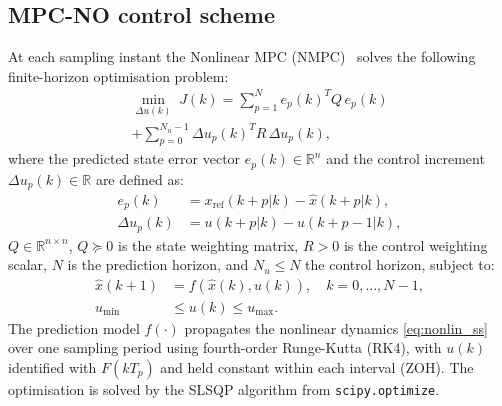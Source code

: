 \documentclass[twocolumn]{svjour3}
\begin{document}
\subsection{MPC-NO control scheme}

At each sampling instant the Nonlinear MPC (NMPC)~\cite{Camacho2026} solves the following
finite-horizon optimisation problem:
\begin{multline}
\min_{\Delta u(k)}\;J(k) = \sum_{p=1}^{N}e_p(k)^T Q\,e_p(k) \\
+ \sum_{p=0}^{N_u-1}\Delta u_p(k)^T R\,\Delta u_p(k),
\label{eq:mpc_cost}
\end{multline}
where the predicted state error vector $e_p(k)\in\mathbb{R}^{n}$ and the control increment
$\Delta u_p(k)\in\mathbb{R}$ are defined as:
\begin{align}
e_p(k) &= x_\mathrm{ref}(k{+}p|k) - \hat{x}(k{+}p|k), \label{eq:ep}\\
\Delta u_p(k) &= u(k{+}p|k) - u(k{+}p{-}1|k), \label{eq:dup}
\end{align}
$Q\in\mathbb{R}^{n\times n}$, $Q\succeq 0$ is the state weighting matrix,
$R>0$ is the control weighting scalar, $N$ is the prediction
horizon, and $N_u\leq N$ the control horizon, subject to:
\begin{align}
\hat{x}(k+1) &= f\!\left(\hat{x}(k),u(k)\right),\quad k=0,\ldots,N{-}1,\\
u_{\min} &\leq u(k) \leq u_{\max}.
\end{align}
The prediction model $f(\cdot)$ propagates the nonlinear dynamics \eqref{eq:nonlin_ss} over
one sampling period using fourth-order Runge-Kutta (RK4), with $u(k)$ identified with $F(kT_p)$
and held constant within each interval (ZOH). The optimisation is solved by the SLSQP algorithm from
\texttt{scipy.optimize}.
\end{document}
